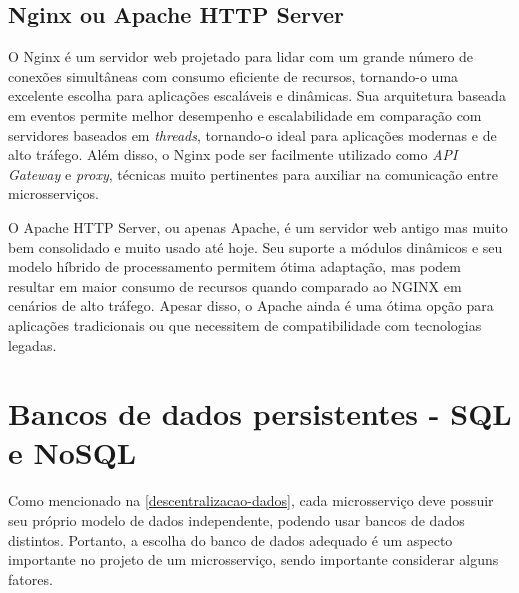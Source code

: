 


\subsection{Nginx ou Apache HTTP Server}
O Nginx é um servidor web projetado para lidar com um grande número de conexões simultâneas com consumo eficiente de recursos, tornando-o uma excelente escolha para aplicações escaláveis e dinâmicas. Sua arquitetura baseada em eventos permite melhor desempenho e escalabilidade em comparação com servidores baseados em \emph{threads}, tornando-o ideal para aplicações modernas e de alto tráfego. Além disso, o Nginx pode ser facilmente utilizado como \emph{API Gateway} e \emph{proxy}, técnicas muito pertinentes para auxiliar na comunicação entre microsserviços. \cite{nginx}

O Apache HTTP Server, ou apenas Apache, é um servidor web antigo mas muito bem consolidado e muito usado até hoje. Seu suporte a módulos dinâmicos e seu modelo híbrido de processamento permitem ótima adaptação, mas podem resultar em maior consumo de recursos quando comparado ao NGINX em cenários de alto tráfego. Apesar disso, o Apache ainda é uma ótima opção para aplicações tradicionais ou que necessitem de compatibilidade com tecnologias legadas. \cite{nginx-vs-apache}


\section{Bancos de dados persistentes - SQL e NoSQL}
Como mencionado na \autoref{descentralizacao-dados}, cada microsserviço deve possuir seu próprio modelo de dados independente, podendo usar bancos de dados distintos. Portanto, a escolha do banco de dados adequado é um aspecto importante no projeto de um microsserviço, sendo importante considerar alguns fatores.

